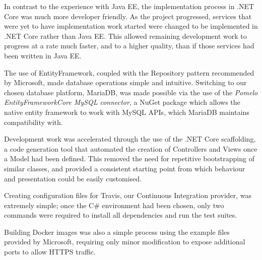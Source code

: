 In contrast to the experience with Java EE, the implementation process in .NET Core was much more developer friendly. As the project progressed, services that were yet to have implementation work started were changed to be implemented in .NET Core rather than Java EE. This allowed remaining development work to progress at a rate much faster, and to a higher quality, than if those services had been written in Java EE.

The use of EntityFramework, coupled with the Repository pattern\cite{dotnet_repository_pattern} recommended by Microsoft, made database operations simple and intuitive. Switching to our chosen database platform, MariaDB, was made possible via the use of the \textit{Pomelo EntityFrameworkCore MySQL connector}\cite{Pomelo}, a NuGet package which allows the native entity framework to work with MySQL APIs, which MariaDB maintains compatibility with.

Development work was accelerated through the use of the .NET Core scaffolding, a code generation tool that automated the creation of Controllers and Views once a Model had been defined. This removed the need for repetitive bootstrapping of similar classes, and provided a consistent starting point from which behaviour and presentation could be easily customised.

Creating configuration files for Travis, our Continuous Integration provider, was extremely simple; once the C# environment had been chosen, only two commands were required to install all dependencies and run the test suites.

Building Docker images was also a simple process using the example files provided by Microsoft\cite{dotnet_docker}, requiring only minor modification to expose additional ports to allow HTTPS traffic.
